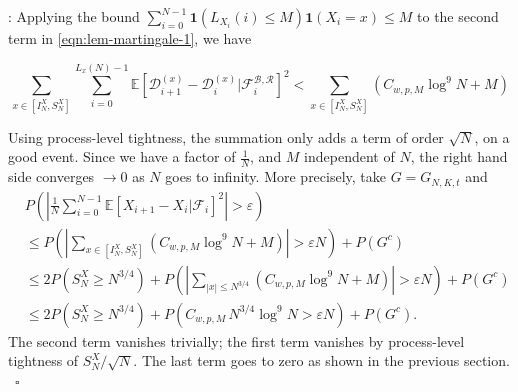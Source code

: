 \documentclass[twoside,12pt,a4paper]{article}
\numberwithin{equation}{section}
\newenvironment{proof}[1][Proof]{{\sc #1}:}{~\hfill $\square$}
\begin{document}
\begin{proof}[Proof of Proposition~\ref{lm: control of martingale}]
Applying the bound $\sum_{i = 0}^{N-1} \mathbf{1}\left( L_{X_i}(i) \le M \right) \mathbf{1}(X_i = x) \le  M$ to the second term in \eqref{eqn:lem-martingale-1}, we have

\begin{equation*}
	\sum_{x \in \left[ I_N^X, S_N^X \right]} \sum_{i = 0}^{L_x(N) - 1} \mathbb{E}\left[ \mathcal{D}_{i+1}^{(x)} - \mathcal{D}_i^{(x)} | \mathcal{F}_{i}^{\mathcal{B}, \mathcal{R}} \right]^2 
	< \sum_{x \in \left[ I_N^X, S_N^X \right]} (C_{w, p, M} \log^9 N +M )
\end{equation*}

Using process-level tightness, the summation only adds a term of order $\sqrt{N}$, on a good event. Since we have a factor of $\frac{1}{N}$, and $M$ independent of $N$, the right hand side converges $\to 0$ as $N$ goes to infinity. More precisely, take $G = G_{N, K, t}$ and
\begin{align*}
	 &P\left( \left| \frac{1}{N} \sum_{i = 0}^{N-1} \mathbb{E}\left[ X_{i+1} - X_i | \mathcal{F}_i \right]^2  \right|  > \varepsilon \right)\\
	 &\le P\left( \left| \sum_{x \in \left[ I_N^X, S_N^X \right]} (C_{w, p, M} \log^9 N +M ) \right| > \varepsilon  N \right) + P(G^c) \\
	 &\le 2 P\left( S_N^X \ge N^{3 / 4} \right) + P\left(  \left| \sum_{|x| \le N^{3 / 4}} (C_{w, p, M} \log^9 N +M ) \right| > \varepsilon  N  \right) +P(G^c)  \\
	 &\le 2 P\left( S_N^X \ge N^{3 / 4} \right) + P\left(  C_{w, p, M} \, N^{3 / 4} \log^9 N > \varepsilon  N  \right) + P(G^c)
.\end{align*}
The second term vanishes trivially; the first term vanishes by process-level tightness of $S_N^X / \sqrt{N} $. The last term goes to zero as shown in the previous section.
\end{proof}

		
		
\end{document}
